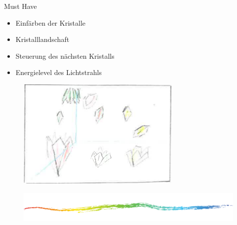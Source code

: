 \begin{frame}{Must Have}
	\onetoone
	{
	\begin{itemize}
		\item Einfärben der Kristalle
		\item Kristalllandschaft
		\item Steuerung des nächsten Kristalls
		\item Energielevel des Lichtstrahls
	\end{itemize}
	}
	{
		\begin{figure}
			\centering
			\includegraphics[width=\textwidth, height=0.4\textheight, keepaspectratio]{images/Skizzen/start-situation}
		\end{figure}
	}
	\begin{figure}
		\centering
		\includegraphics[width=\textwidth, height=0.7\textheight, keepaspectratio]{images/chalk-154720}
	\end{figure}
\end{frame} 

